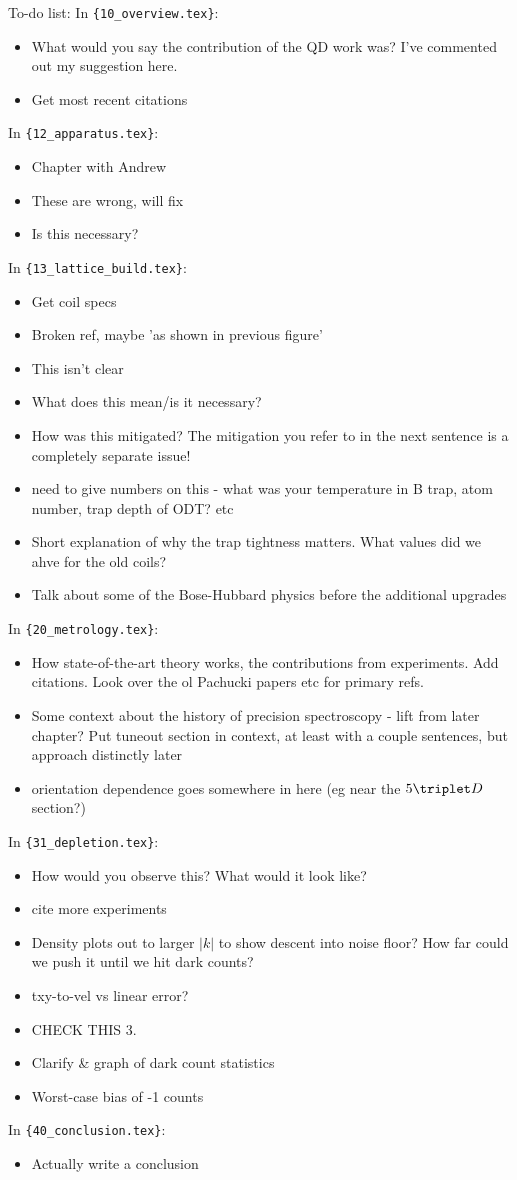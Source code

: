 To-do list:\newline
In \verb|{10_overview.tex}|:
\begin{itemize}
\item {What would you say the contribution of the QD work was? I've commented out my suggestion here.}
\item {Get most recent citations}
\end{itemize}
In \verb|{12_apparatus.tex}|:
\begin{itemize}
\item {Chapter with Andrew}
\item {These are wrong, will fix}
\item {Is this necessary?}
\end{itemize}
In \verb|{13_lattice_build.tex}|:
\begin{itemize}
\item {Get coil specs}
\item {Broken ref, maybe 'as shown in previous figure'}
\item {This isn't clear}
\item {What does this mean/is it necessary?}
\item {How was this mitigated?  The mitigation you refer to in the next sentence is a completely separate issue!}
\item {need to give numbers on this - what was your temperature in B trap, atom number, trap depth of ODT? etc}
\item {Short explanation of why the trap tightness matters.	What values did we ahve for the old coils?}
\item {Talk about some of the Bose-Hubbard physics before the additional upgrades}
\end{itemize}
In \verb|{20_metrology.tex}|:
\begin{itemize}
\item {How state-of-the-art theory works, the contributions from experiments. Add citations. Look over the ol Pachucki papers etc for primary refs. }
\item {Some context about the history of precision spectroscopy - lift from later chapter? Put tuneout section in context, at least with a couple sentences, but approach distinctly later}
\item {orientation dependence goes somewhere in here (eg near the $5\triplet D$ section?)}
\end{itemize}
In \verb|{31_depletion.tex}|:
\begin{itemize}
\item {How would you observe this?  What would it look like?}
\item {cite more experiments}
\item {Density plots out to larger $|k|$ to show descent into noise floor? How far could we push it until we hit dark counts?}
\item {txy-to-vel vs linear error?}
\item {CHECK THIS 3.}
\item {Clarify \& graph of dark count statistics}
\item {Worst-case bias of -1 counts}
\end{itemize}
In \verb|{40_conclusion.tex}|:
\begin{itemize}
\item {Actually write a conclusion}
\end{itemize}

